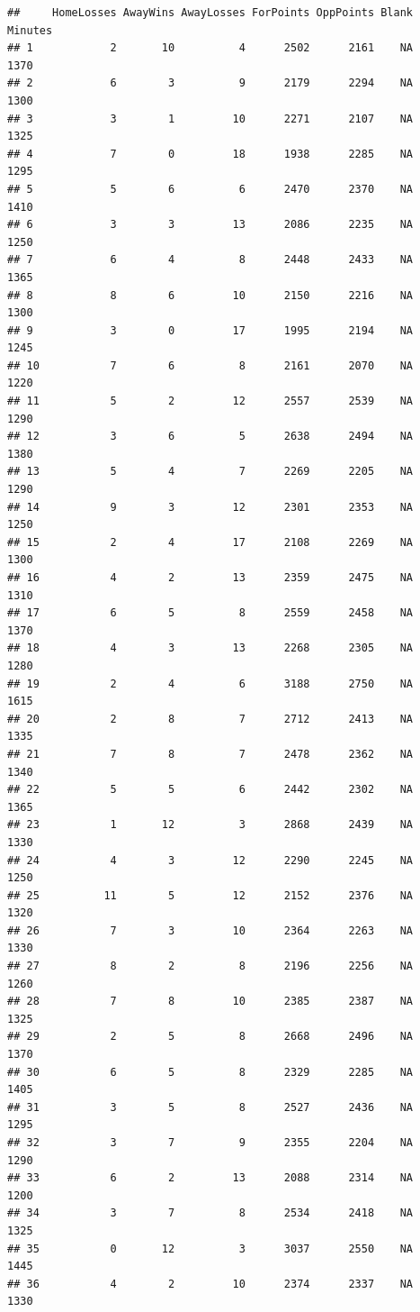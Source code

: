 \documentclass[]{book}
\begin{document}
\begin{verbatim}
##     HomeLosses AwayWins AwayLosses ForPoints OppPoints Blank Minutes
## 1            2       10          4      2502      2161    NA    1370
## 2            6        3          9      2179      2294    NA    1300
## 3            3        1         10      2271      2107    NA    1325
## 4            7        0         18      1938      2285    NA    1295
## 5            5        6          6      2470      2370    NA    1410
## 6            3        3         13      2086      2235    NA    1250
## 7            6        4          8      2448      2433    NA    1365
## 8            8        6         10      2150      2216    NA    1300
## 9            3        0         17      1995      2194    NA    1245
## 10           7        6          8      2161      2070    NA    1220
## 11           5        2         12      2557      2539    NA    1290
## 12           3        6          5      2638      2494    NA    1380
## 13           5        4          7      2269      2205    NA    1290
## 14           9        3         12      2301      2353    NA    1250
## 15           2        4         17      2108      2269    NA    1300
## 16           4        2         13      2359      2475    NA    1310
## 17           6        5          8      2559      2458    NA    1370
## 18           4        3         13      2268      2305    NA    1280
## 19           2        4          6      3188      2750    NA    1615
## 20           2        8          7      2712      2413    NA    1335
## 21           7        8          7      2478      2362    NA    1340
## 22           5        5          6      2442      2302    NA    1365
## 23           1       12          3      2868      2439    NA    1330
## 24           4        3         12      2290      2245    NA    1250
## 25          11        5         12      2152      2376    NA    1320
## 26           7        3         10      2364      2263    NA    1330
## 27           8        2          8      2196      2256    NA    1260
## 28           7        8         10      2385      2387    NA    1325
## 29           2        5          8      2668      2496    NA    1370
## 30           6        5          8      2329      2285    NA    1405
## 31           3        5          8      2527      2436    NA    1295
## 32           3        7          9      2355      2204    NA    1290
## 33           6        2         13      2088      2314    NA    1200
## 34           3        7          8      2534      2418    NA    1325
## 35           0       12          3      3037      2550    NA    1445
## 36           4        2         10      2374      2337    NA    1330

\end{verbatim}
\end{document}
